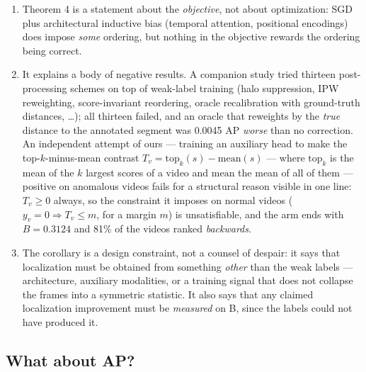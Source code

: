 \documentclass[number,preprint,12pt]{elsarticle}
\begin{document}
\begin{enumerate}
\def\labelenumi{(\roman{enumi})}
\item
  Theorem 4 is a statement about the \emph{objective}, not about optimization: SGD
  plus architectural inductive bias (temporal attention, positional encodings)
  does impose \emph{some} ordering, but nothing in the objective rewards the ordering
  being correct.
\item
  It explains a body of negative results. A companion study
  \citep{debiasvad2026} tried thirteen post-processing schemes on top of weak-label training
  (halo suppression, IPW reweighting, score-invariant reordering, oracle
  recalibration with ground-truth distances, \dots{}); all thirteen failed, and an oracle
  that reweights by the \emph{true} distance to the annotated segment was 0.0045 AP
  \emph{worse} than no correction. An independent attempt of ours --- training an
  auxiliary head to make the top-\(k\)-minus-mean contrast
  \(T_v=\mathrm{top}_k(s)-\mathrm{mean}(s)\) --- where \(\mathrm{top}_k\) is the mean of
  the \(k\) largest scores of a video and \(\mathrm{mean}\) the mean of all of them ---
  positive on anomalous videos fails for a structural reason visible in one line:
  \(T_v\ge 0\) always, so the constraint it imposes on normal videos
  (\(y_v=0\Rightarrow T_v\le m\), for a margin \(m\)) is unsatisfiable, and the arm ends with \(B=0.3124\) and 81\% of
  the videos ranked \emph{backwards}.
\item
  The corollary is a design constraint, not a counsel of despair: it says
  that localization must be obtained from something \emph{other} than the weak labels ---
  architecture, auxiliary modalities, or a training signal that does not collapse
  the frames into a symmetric statistic. It also says that any claimed
  localization improvement must be \emph{measured} on B, since the labels could not have
  produced it.
\end{enumerate}

\subsection{What about AP?}\label{sec:ap}
\end{document}
